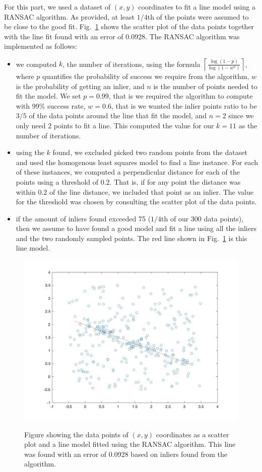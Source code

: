 For this part, we used a dataset of $(x, y)$ coordinates to fit a line model using a RANSAC algorithm. As provided, at least $1/4$th of the points were assumed to be close to the good fit. Fig.~\ref{fig:line} shows the scatter plot of the data points together with the line fit found with an error of 0.0928. The RANSAC algorithm was implemented as follows:
\begin{itemize}
	\item we computed $k$, the number of iterations, using the formula $\left \lceil \frac{\log (1 - p)}{\log (1 - w^n)} \right \rceil$, where $p$ quantifies the probability of success we require from the algorithm, $w$ is the probability of getting an inlier, and $n$ is the number of points needed to fit the model. We set $p = 0.99$, that is we required the algorithm to compute with 99\% success rate, $w = 0.6$, that is we wanted the inlier points ratio to be $3/5$ of the data points around the line that fit the model, and $n = 2$ since we only need 2 points to fit a line. This computed the value for our $k=11$ as the number of iterations. 
	\item using the $k$ found, we excluded picked two random points from the dataset and used the homogenous least squares model to find a line instance. For each of these instances, we computed a perpendicular distance for each of the points using a threshold of $0.2$. That is, if for any point the distance was within $0.2$ of the line distance, we included that point as an inlier. The value for the threshold was chosen by consulting the scatter plot of the data points.
	\item if the amount of inliers found exceeded 75 ($1/4$th of our 300 data points), then we assume to have found a good model and fit a line using all the inliers and the two randomly sampled points. The red line shown in Fig.~\ref{fig:line} is this line model.
\end{itemize} 

\begin{figure}[ht]
	\center
	{\includegraphics[width=5in]{figs/ransac_fit.jpg}}
    \caption{Figure showing the data points of $(x, y)$ coordinates as a scatter plot and a line model fitted using the RANSAC algorithm. This line was found with an error of 0.0928 based on inliers found from the algorithm.}
    \label{fig:line}
\end{figure} 